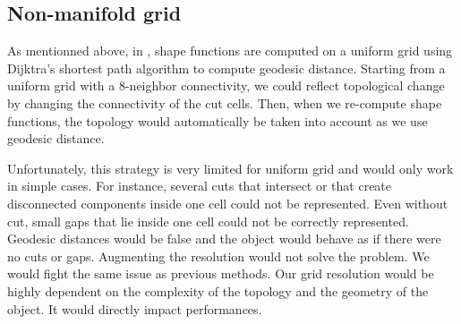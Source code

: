 
\subsection{Non-manifold grid}

As mentionned above, in \cite{Faure2011}, shape functions are computed on a uniform grid using Dijktra's shortest path algorithm to compute geodesic distance. Starting from a uniform grid with a 8-neighbor connectivity, we could reflect topological change by changing the connectivity of the cut cells. Then, when we re-compute shape functions, the topology would automatically be taken into account as we use geodesic distance. 

Unfortunately, this strategy is very limited for uniform grid and would only work in simple cases. For instance, several cuts that intersect or that create disconnected components inside one cell could not be represented. Even without cut, small gaps that lie inside one cell could not be correctly represented. Geodesic distances would be false and the object would behave as if there were no cuts or gaps. Augmenting the resolution would not solve the problem. We would fight the same issue as previous methods. Our grid resolution would be highly dependent on the complexity of the topology and the geometry of the object. It would directly impact performances.


